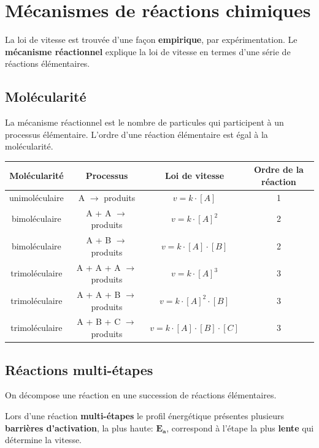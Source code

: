 \documentclass[10pt,a4paper]{book}
\begin{document}
\section{Mécanismes de réactions chimiques}

La loi de vitesse est trouvée d’une façon \textbf{empirique}, par expérimentation.
Le \textbf{mécanisme réactionnel} explique la loi de vitesse en termes d’une série de réactions élémentaires.

\subsection{Molécularité}

La mécanisme réactionnel  est le nombre de particules qui participent à un processus élémentaire. L'ordre d'une réaction élémentaire est égal à la molécularité.

\begin{center}
\begin{tabular}{| c | c | c | c |}
\hline
\textbf{Molécularité} & \textbf{Processus} & \textbf{Loi de vitesse} & \textbf{Ordre de la réaction} \\
\hline
unimoléculaire & A $\rightarrow$ produits & $v = k\cdot [A]$ & 1 \\
\hline
bimoléculaire & A + A $\rightarrow$ produits & $v = k\cdot [A]^2$ & 2 \\
\hline
bimoléculaire & A + B $\rightarrow$ produits & $v = k\cdot [A]\cdot [B]$ & 2 \\
\hline
trimoléculaire & A + A + A $\rightarrow$ produits & $v = k\cdot [A]^3$ & 3 \\
\hline
trimoléculaire & A + A + B $\rightarrow$ produits & $v = k\cdot [A]^2\cdot [B]$ & 3 \\
\hline
trimoléculaire & A + B + C $\rightarrow$ produits & $v = k\cdot [A]\cdot [B]\cdot [C]$ & 3 \\
\hline
\end{tabular}
\end{center}

\subsection{Réactions multi-étapes}

On décompose une réaction en une succession de réactions élémentaires. \par
Lors d'une réaction \textbf{multi-étapes} le profil énergétique présentes plusieurs \textbf{barrières d'activation}, la plus haute: $\mathbf{E_a}$, correspond à l'étape la plus \textbf{lente} qui détermine la vitesse.
\end{document}
